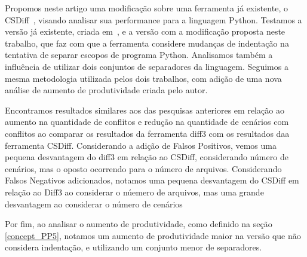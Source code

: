 Propomos neste artigo uma modificação sobre uma ferramenta já existente, o CSDiff~\cite{clem21},
visando analisar sua performance para a linguagem Python. Testamos a versão já existente, criada em~\cite{heitor21},
e a versão com a modificação proposta neste trabalho, que faz com que a ferramenta considere mudanças de indentação na
tentativa de separar escopos de programa Python. Analisamos também a influência de utilizar dois conjuntos de separadores da
linguagem. Seguimos a mesma metodologia utilizada pelos dois trabalhos, com adição de uma nova análise
de aumento de produtividade criada pelo autor.

Encontramos resultados similares aos das pesquisas anteriores em relação ao aumento na quantidade de conflitos e redução na
quantidade de cenários com conflitos ao comparar os resultados da ferramenta diff3 com os resultados daa ferramenta CSDiff.
Considerando a adição de Falsos Positivos, vemos uma pequena desvantagem do diff3 em relação ao CSDiff, considerando número de
cenários, mas o oposto ocorrendo para o número de arquivos. Considerando Falsos Negativos adicionados, notamos uma pequena
desvantagem do CSDiff em relação ao Diff3 ao considerar o núemero de
arquivos, mas uma grande desvantagem ao considerar o número de cenários

Por fim, ao analisar o aumento de produtividade, como definido na seção \ref{concept_PP5}, notamos um aumento de
produtividade maior na versão que não considera indentação, e utilizando um conjunto menor de separadores.


